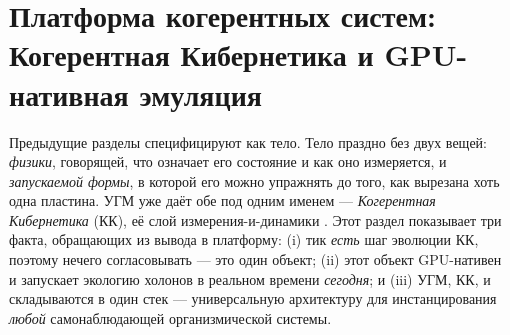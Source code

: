\section{Платформа когерентных систем: Когерентная Кибернетика и GPU-нативная эмуляция}
\label{sec:platform}

Предыдущие разделы специфицируют \TALOS{} как тело. Тело праздно без двух вещей:
\emph{физики}, говорящей, что означает его состояние и как оно измеряется, и
\emph{запускаемой формы}, в которой его можно упражнять до того, как вырезана
хоть одна пластина. УГМ уже даёт обе под одним именем --- \emph{Когерентная
Кибернетика} (КК), её слой измерения-и-динамики \cite{uhm2026}. Этот раздел
показывает три факта, обращающих \TALOS{} из вывода в платформу: (i) тик
\TALOS{} \emph{есть} шаг эволюции КК, поэтому нечего согласовывать --- это один
объект; (ii) этот объект GPU-нативен и запускает экологию холонов в реальном
времени \emph{сегодня}; и (iii) УГМ, КК, \SYNARC{} и \TALOS{} складываются в один
стек --- универсальную архитектуру для инстанцирования \emph{любой}
самонаблюдающей организмической системы.


